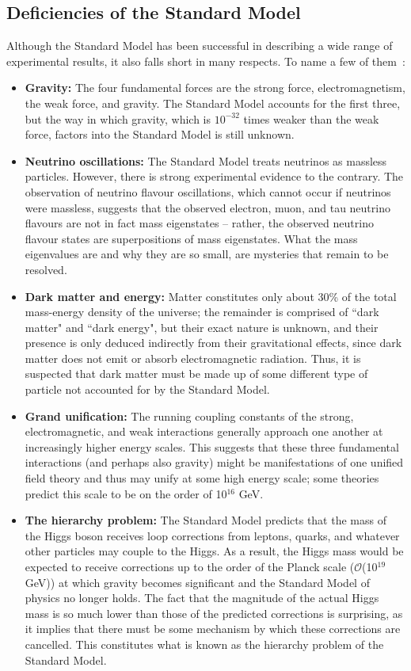 \subsection{Deficiencies of the Standard Model\label{sec:SMdeficiencies}}

Although the Standard Model has been successful in describing a wide range of experimental results, it also falls short in many respects. To name a few of them~\cite{BettiniPhysics}:

\begin{itemize}
\item \textbf{Gravity: }The four fundamental forces are the strong force, electromagnetism, the weak force, and gravity. The Standard Model accounts for the first three, but the way in which gravity, which is $10^{-32}$ times weaker than the weak force, factors into the Standard Model is still unknown.
\item \textbf{Neutrino oscillations: }The Standard Model treats neutrinos as massless particles. However, there is strong experimental evidence to the contrary. The observation of neutrino flavour oscillations, which cannot occur if neutrinos were massless, suggests that the observed electron, muon, and tau neutrino flavours are not in fact mass eigenstates -- rather, the observed neutrino flavour states are superpositions of mass eigenstates. What the mass eigenvalues are and why they are so small, are mysteries that remain to be resolved.
\item \textbf{Dark matter and energy: }Matter constitutes only about 30\% of the total mass-energy density of the universe; the remainder is comprised of ``dark matter" and ``dark energy", but their exact nature is unknown, and their presence is only deduced indirectly from their gravitational effects, since dark matter does not emit or absorb electromagnetic radiation. Thus, it is suspected that dark matter must be made up of some different type of particle not accounted for by the Standard Model.
\item \textbf{Grand unification: }The running coupling constants of the strong, electromagnetic, and weak interactions generally approach one another at increasingly higher energy scales. This suggests that these three fundamental interactions (and perhaps also gravity) might be manifestations of one unified field theory and thus may unify at some high energy scale; some theories predict this scale to be on the order of 10$^{16}$ GeV.
\item \textbf{The hierarchy problem: }The Standard Model predicts that the mass of the Higgs boson receives loop corrections from leptons, quarks, and whatever other particles may couple to the Higgs. As a result, the Higgs mass would be expected to receive corrections up to the order of the Planck scale ($\mathcal{O}$(10$^{19}$ GeV)) at which gravity becomes significant and the Standard Model of physics no longer holds. The fact that the magnitude of the actual Higgs mass is so much lower than those of the predicted corrections is surprising, as it implies that there must be some mechanism by which these corrections are cancelled. This constitutes what is known as the hierarchy problem of the Standard Model.
\end{itemize}


